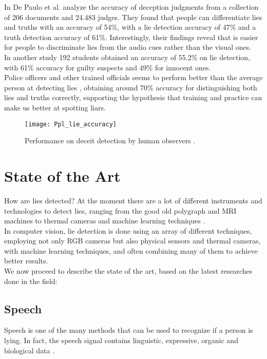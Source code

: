 In \cite{BondDePauloAccuracy} De Paulo et al. analyze the accuracy of deception judgments from a collection of 206 documents and 24.483 judges. They found that people can differentiate lies and truths with an accuracy of 54\%, with a lie detection accuracy of 47\% and a truth detection accuracy of 61\%. Interestingly, their findings reveal that is easier for people to discriminate lies from the audio cues rather than the visual ones. \\

In another study \cite{HartwigGranhag} 192 students obtained an accuracy of 55.2\% on lie detection, with 61\% accuracy for guilty suspects and 49\% for innocent ones.\\
Police officers and other trained officials seems to perform better than the average person at detecting lies  \cite{VrijPoliceDetect}, obtaining around 70\% accuracy for distinguishing both lies and truths correctly, supporting the hypothesis that training and practice can make us better at spotting liars.

\begin{figure}[H]
	\centering
	\texttt{[image: Ppl\_lie\_accuracy]}
	\caption{Performance on deceit detection by human observers \cite{SU201652}.}
\end{figure}
 
\pagebreak

\section{State of the Art} \label{sota}
How are lies detected? At the moment there are a lot of different instruments and technologies to detect lies, ranging from the good old polygraph and MRI machines to thermal cameras and machine learning techniques . \\

In computer vision, lie detection is done using an array of different techniques, employing not only RGB cameras but also physical sensors and thermal cameras, with machine learning techniques, and often combining many of them to achieve better results. \\

We now proceed to describe the state of the art, based on the latest researches done in the field:

\subsection*{Speech}
Speech is one of the many methods that can be used to recognize if a person is lying. In fact, the speech signal contains linguistic, expressive, organic and biological data \cite{norena}. \\

